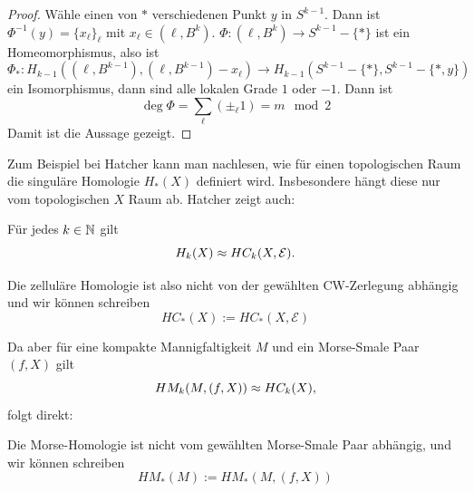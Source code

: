 \begin{proof}
    Wähle einen von $\ast$ verschiedenen Punkt $y$ in $S^{k - 1}$. Dann ist 
    $\Phi^{-1}(y) = \{ x_{\ell} \}_{\ell}$ mit $x_{\ell} \in (\ell, B^k)$. 
    $\Phi \colon (\ell, B^k) \to S^{k - 1} - \{ \ast \}$ ist ein Homeomorphismus, also ist 
    \[ \Phi_{\ast} \colon H_{k - 1} ((\ell, B^{k - 1}), (\ell, B^{k - 1}) - x_{\ell}) \to 
        H_{k - 1}(S^{k - 1} - \{ \ast \}, S^{k - 1} - \{ \ast, y \}) \]
    ein Isomorphismus, dann sind alle lokalen Grade $1$ oder $-1$. Dann ist 
    \[ \deg \Phi = \sum_{\ell} (\pm_{\ell} 1) = m \mod 2 \]
    Damit ist die Aussage gezeigt.
\end{proof}

Zum Beispiel bei Hatcher \cite{hatcher} kann man nachlesen, wie für einen topologischen Raum die 
singuläre Homologie $H_{\ast} (X)$ definiert wird. Insbesondere hängt diese nur vom topologischen 
$X$ Raum ab. Hatcher zeigt auch: 

\begin{theorem}
    \label{satz: zellulaere Homologie ist singuläre Homologie}
    Für jedes $k \in { \mathbb N }$ gilt 
    \[ H_k (X) \approx HC_k (X, \mathcal{E}) . \]
\end{theorem}

Die zelluläre Homologie ist also nicht von der gewählten CW-Zerlegung abhängig und wir können schreiben
\[ HC_{\ast} (X) := HC_{\ast} (X, \mathcal{E}) \]

Da aber für eine kompakte Mannigfaltigkeit $M$ und ein Morse-Smale Paar $(f, X)$ gilt 
\[ HM_k(M, (f, X)) \approx HC_k(X) , \]
folgt direkt:

\begin{theorem}
    Die Morse-Homologie ist nicht vom gewählten Morse-Smale Paar abhängig, und wir können schreiben
    \[ HM_{\ast} (M) := HM_{\ast}(M, (f, X)) \]
\end{theorem}
